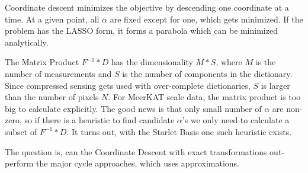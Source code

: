 Coordinate descent minimizes the objective by descending one coordinate at a time. At a given point, all $\alpha$ are fixed except for one, which gets minimized. If the problem has the LASSO form, it forms a parabola which can be minimized analytically.

The Matrix Product $F^{-1}*D$ has the dimensionality $M*S$, where $M$ is the number of measurements and $S$ is the number of components in the dictionary. Since compressed sensing gets used with over-complete dictionaries, $S$ is larger than the number of pixels $N$. For MeerKAT scale data, the matrix product is too big to calculate explicitly.  The good news is that only small number of $\alpha$ are non-zero, so if there is a heuristic to find candidate $\alpha$'s we only need to calculate a subset of $F^{-1}*D$. It turns out, with the Starlet Basis one such heuristic exists.

The question is, can the Coordinate Descent with exact transformations out-perform the major cycle approaches, which uses approximations.


